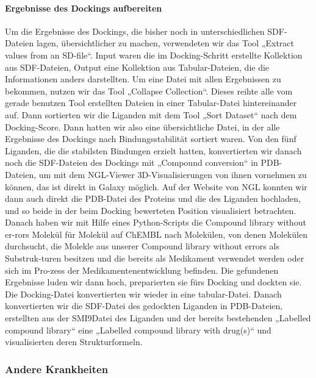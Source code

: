 \documentclass[11pt]{article}
\begin{document}
    \paragraph{Ergebnisse des Dockings aufbereiten}
    Um die Ergebnisse des Dockings, die bisher noch in unterschiedlichen SDF-Dateien lagen, übersichtlicher zu machen, verwendeten wir das Tool „Extract values from an SD-file“. Input waren die im Docking-Schritt erstellte Kollektion aus SDF-Dateien, Output eine Kollektion aus Tabular-Dateien, die die Informationen anders darstellten.
    Um eine Datei mit allen Ergebnissen zu bekommen, nutzen wir das Tool „Collapse Collection“. Dieses reihte alle vom gerade benutzen Tool erstellten Dateien in einer Tabular-Datei hintereinander auf. Dann sortierten wir die Liganden mit dem Tool „Sort Dataset“ nach dem Docking-Score.
    Dann hatten wir also eine übersichtliche Datei, in der alle Ergebnisse des Dockings nach Bindungsstabilität sortiert waren.
    Von den fünf Liganden, die die stabilsten Bindungen erzielt hatten, konvertierten wir danach noch die SDF-Dateien des Dockings mit „Compound conversion“ in PDB-Dateien, um mit dem NGL-Viewer 3D-Visualisierungen von ihnen vornehmen zu können, das ist direkt in Galaxy möglich.
    Auf der Website von NGL konnten wir dann auch direkt die PDB-Datei des Proteins und die des Liganden hochladen, und so beide in der beim Docking bewerteten Position visualisiert betrachten.
    Danach haben wir mit Hilfe eines Python-Scripts die Compound library without er-rors Molekül für Molekül auf ChEMBL nach Molekülen, von denen Molekülen durchsucht, die Molekle aus unserer Compound library without errors als Substruk-turen besitzen und die bereits als Medikament verwendet werden oder sich im Pro-zess der Medikamentenentwicklung befinden. Die gefundenen Ergebnisse luden wir dann hoch, preparierten sie fürs Docking und dockten sie. Die Docking-Datei konvertierten wir wieder in eine tabular-Datei. Danach konvertierten wir die SDF-Datei des gedockten Liganden in PDB-Dateien, erstellten aus der SMI9Datei des Liganden und der bereits bestehenden „Labelled compound library“ eine „Labelled compound library with drug(s)“ und visualisierten deren Strukturformeln.

    


    \subsubsection{Andere Krankheiten}
\end{document}
